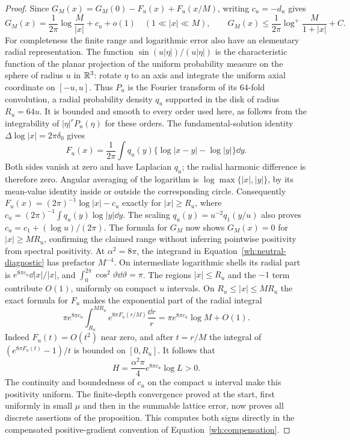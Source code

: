 \begin{proof}
Since
$G_M(x)=G_M(0)-F_u(x)+F_u(x/M)$, writing $c_u=-d_u$ gives
\begin{equation}\label{wh:intermediate-log}
 G_M(x)=\frac1{2\pi}\log\frac M{|x|}+c_u+o(1)
       \quad(1\ll|x|\ll M),
 \qquad
 G_M(x)\le\frac1{2\pi}\log^+\frac M{1+|x|}+C.
\end{equation}
For completeness the finite range and logarithmic error also have an
elementary radial representation.  The function
$\sin(u|\eta|)/(u|\eta|)$ is the characteristic function of the
planar projection of the uniform probability measure on the sphere
of radius $u$ in $\mathbb R^3$: rotate $\eta$ to an axis and integrate the
uniform axial coordinate on $[-u,u]$.  Thus $P_u$ is the Fourier
transform of its $64$-fold convolution, a radial probability density
$q_u$ supported in the disk of radius $R_u=64u$.  It is bounded and
smooth to every order used here, as follows from the integrability
of $|\eta|^rP_u(\eta)$ for these orders.  The fundamental-solution
identity $\Delta\log|x|=2\pi\delta_0$ gives
\[
 F_u(x)=\frac1{2\pi}\int q_u(y)
                \{\log|x-y|-\log|y|\}\dd y.
\]
Both sides vanish at zero and have Laplacian $q_u$; the radial
harmonic difference is therefore zero.  Angular averaging of the
logarithm is $\log\max\{|x|,|y|\}$, by its mean-value identity
inside or outside the corresponding circle.  Consequently
$F_u(x)=(2\pi)^{-1}\log|x|-c_u$ exactly for $|x|\ge R_u$,
where $c_u=(2\pi)^{-1}\int q_u(y)\log|y|\dd y$.
The scaling $q_u(y)=u^{-2}q_1(y/u)$ also proves
$c_u=c_1+(\log u)/(2\pi)$.  The formula for $G_M$ now shows
$G_M(x)=0$ for $|x|\ge MR_u$, confirming the claimed range without
inferring pointwise positivity from spectral positivity.
At $\alpha^2=8\pi$, the integrand in
Equation~\eqref{wh:neutral-diagnostic} has prefactor $M^{-4}$.
On intermediate logarithmic shells its radial part is
$e^{8\pi c_u}\dd|x|/|x|$, and
$\int_0^{2\pi}\cos^2\vartheta\dd\vartheta=\pi$.
The regions $|x|\le R_u$ and the $-1$ term contribute $O(1)$,
uniformly on compact $u$ intervals.  On $R_u\le|x|\le MR_u$ the
exact formula for $F_u$ makes the exponential part of the radial
integral
\[
 \pi e^{8\pi c_u}\int_{R_u}^{MR_u}
                   e^{8\pi F_u(r/M)}\frac{\dd r}{r}
 =\pi e^{8\pi c_u}\log M+O(1).
\]
Indeed $F_u(t)=O(t^2)$ near zero, and after $t=r/M$ the integral
of $(e^{8\pi F_u(t)}-1)/t$ is bounded on $[0,R_u]$.
It follows that
\begin{equation}\label{wh:H-value}
 H=\frac{\alpha^2\pi}{4}e^{8\pi c_u}\log L>0.
\end{equation}
The continuity and boundedness of $c_u$ on the compact $u$ interval
make this positivity uniform.  The finite-depth convergence proved
at the start, first uniformly in small $\mu$ and then in the
summable lattice error, now proves all discrete assertions of the
proposition.  This computes both signs directly in the compensated
positive-gradient convention of Equation~\eqref{wh:compensation}.


\end{proof}
